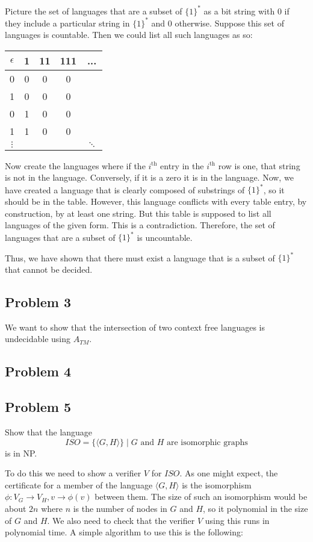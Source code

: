 \documentclass[english]{article}
\begin{document}
Picture the set of languages that are a subset of $\{1\}^*$ as a bit string with 0 if they include
a particular string in $\{1\}^*$ and 0 otherwise. Suppose this set of languages is countable.
Then we could list all such languages as so:\\

\begin{tabular}{c|c|c|c|c}
	$\epsilon$ & 1 & 11 & 111 & ... \\ \hline
	0 & 0 & 0 & 0 & \\ \hline
	1 & 0 & 0 & 0 & \\ \hline
	0 & 1 & 0 & 0 & \\ \hline
	1 & 1 & 0 & 0 & \\ \hline
	$\vdots$ &&&& $\ddots$ \\
\end{tabular}

Now create the languages where if the $i^{\text{th}}$ entry in the $i^{\text{th}}$ row
is one, that string is not in the language. Conversely, if it is a zero it is in the language.
Now, we have created a language that is clearly composed of substrings of $\{1\}^*$, so it
should be in the table. However, this language conflicts with every table entry, by construction,
by at least one string. But this table is supposed to list all languages of the given form.
This is a contradiction. Therefore, the set of languages that are a subset of $\{1\}^*$
is uncountable.

Thus, we have shown that there must exist a language that is a subset of $\{1\}^*$ that cannot
be decided.

\subsection*{Problem 3}
We want to show that the intersection of two context free languages is
undecidable using $A_{TM}$. 

\subsection*{Problem 4}
\subsection*{Problem 5}
Show that the language
\[ ISO = \{ \langle G, H \rangle \} \mid
		\textrm{$G$ and $H$ are isomorphic graphs} \]
is in NP.

To do this we need to show a verifier $V$ for $ISO$. As one might expect, the
certificate for a member of the language $\langle G, H \rangle$ is the
isomorphism $\phi: V_G \rightarrow V_H, v \rightarrow \phi(v)$ between them.
The size of such an isomorphism would be about $2n$ where $n$ is the number of
nodes in $G$ and $H$, so it polynomial in the size of $G$ and $H$. 
We also need to check that the verifier $V$ using this runs in polynomial
time. A simple algorithm to use this is the following:
\end{document}
